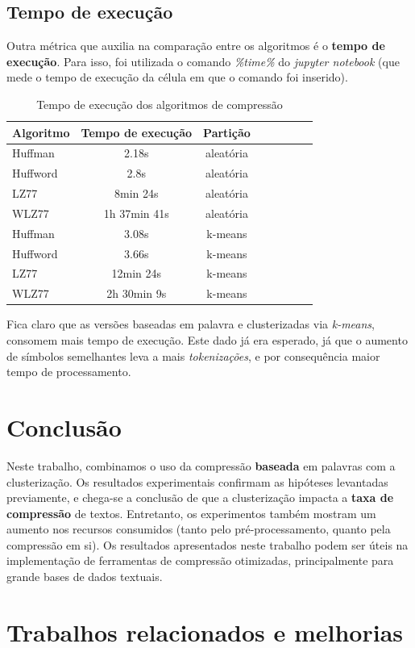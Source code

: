 \subsection{Tempo de execução}
Outra métrica que auxilia na comparação entre os algoritmos é o \textbf{tempo de execução}.
Para isso, foi utilizada o comando \emph{\%time\%} do \emph{jupyter notebook} (que mede o tempo de execução da célula em que o comando foi inserido).

\begin{table}[H]
   \centering
   \caption{Tempo de execução dos algoritmos de compressão} \label{tab:vcode}
   \begin{tabular}{|l|c|c|c|c|c|c|r|}
        \hline
        \small{Algoritmo} & \small{Tempo de execução} & \small{Partição} \\ \hline
              Huffman   &   2.18s                        & aleatória \\ \hline
              Huffword  &   2.8s                          & aleatória \\ \hline
              LZ77        &   8min 24s                  & aleatória \\ \hline
              WLZ77    &   1h 37min 41s           & aleatória \\ \hline
              Huffman  &   3.08s                       & k-means \\ \hline
              Huffword &   3.66s                       & k-means \\ \hline
              LZ77       &   12min 24s               & k-means \\ \hline
              WLZ77   &   2h 30min 9s            & k-means \\ \hline
  \end{tabular}
\end{table}

Fica claro que as versões baseadas em palavra e clusterizadas via \emph{k-means}, consomem mais tempo de execução.
Este dado já era esperado, já que o aumento de símbolos semelhantes leva a mais \emph{tokenizações}, e por consequência maior tempo de processamento.

\section{Conclusão}
Neste trabalho, combinamos o uso da compressão \textbf{baseada} em palavras com a clusterização.
Os resultados experimentais confirmam as hipóteses levantadas previamente, 
e chega-se a conclusão de que a clusterização impacta  a \textbf{taxa de compressão} de textos.
Entretanto, os experimentos também mostram um aumento nos recursos consumidos (tanto pelo pré-processamento, quanto pela compressão em si).
Os resultados apresentados neste trabalho podem ser úteis na implementação de ferramentas de compressão otimizadas, principalmente para grande bases de dados textuais.
\section{Trabalhos relacionados e melhorias}




